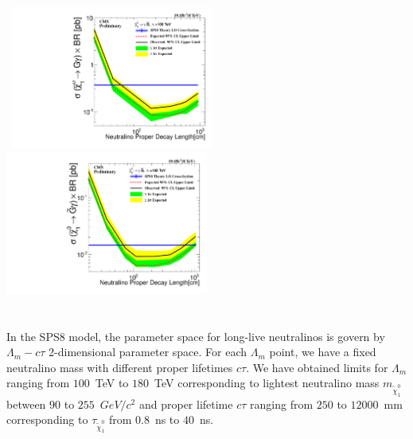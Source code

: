 \begin{minipage}{0.90\linewidth}
\begin{center}
\mbox{
\includegraphics[height=0.5\textwidth,width=0.5\textwidth]{THESISPLOTS/100TeV_Neutralino_CrossSecTimesBR_Uplimit.pdf}
\includegraphics[height=0.5\textwidth, width=0.5\textwidth]{THESISPLOTS/Neutralino_CrossSecTimesBR_Uplimit.pdf} }
\label{fig:SPS8_Ctau_Ulimit}
\end{center}
\end{minipage}
\paragraph*{}\mbox{}\\

In the SPS8 model, the parameter space for long-live neutralinos is govern by $\Lambda_{m}-c\tau$ 2-dimensional parameter space. For each $\Lambda_{m}$ point, we have a fixed neutralino mass with different proper lifetimes $c\tau$. We have obtained limits for $\Lambda_{m}$ ranging from $100$~TeV to $180$~TeV corresponding to lightest neutralino mass $m_{\tilde{\chi}^{0}_{1}}$ between $90$ to $255$~$GeV/c^{2}$ and proper lifetime $c\tau$ ranging from $250$ to $12000$~mm corresponding to $\tau_{\tilde{\chi}^{0}_{1}}$ from $0.8$~ns to $40$~ns.

